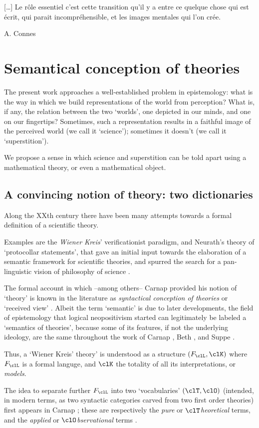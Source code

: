 \epigraph{[\dots\unkern] Le rôle essentiel c'est cette transition qu'il y a entre ce quelque chose qui est écrit, qui parait incompréhensible, et les images mentales qui l'on crée.}{A. Connes}
\section{Semantical conception of theories}\label{sec_1_intro}
The present work approaches a well-established problem in epistemology: what is the way in which we build representations of the world from perception? What is, if any, the relation between the two `worlds', one depicted in our minds, and one on our fingertips? Sometimes, such a representation results in a faithful image of the perceived world (we call it `science'); sometimes it doesn't (we call it `superstition'). 

We propose a sense in which science and superstition can be told apart using a mathematical theory, or even a mathematical object.
\subsection{A convincing notion of theory: two dictionaries}
Along the XXth century there have been many attempts towards a formal definition of a scientific theory. 

Examples are the \emph{Wiener Kreis}' verificationist paradigm, and Neurath's theory of `protocollar statements', that gave an initial input towards the elaboration of a semantic framework for scientific theories, and spurred the search for a pan-linguistic vision of philosophy of science \cite{Weinb}.

The formal account in which --among others-- Carnap \cite{carnapfound} provided his notion of `theory' is known in the literature as \emph{syntactical conception of theories} or `received view' \cite{krause-foundation,krause2011axiomatization,giunti2016}. Albeit the term `semantic' is due to later developments, the field of epistemology that logical neopositivism started can legitimately be labeled a `semantics of theories', because some of its features, if not the underlying ideology, are the same throughout the work of Carnap \cite{carnap56,carnapfound},  Beth \cite{?}, and Suppe \cite{suppe89}.

Thus, a `Wiener Kreis' theory' is understood as a structure $(F_\clL, \clK)$ where $F_\clL$ is a formal languge, and $\clK$ the totality of all its interpretations, or \emph{models}. 

The idea to separate further $F_\clL$ into two `vocabularies' $(\clT,\clO)$ (intended, in modern terms, as two syntactic categories carved from two first order theories) first appears in Carnap \cite{}; these are respectively the \emph{pure} or $\clT$\emph{heoretical} terms, and the \emph{applied} or $\clO$\emph{bservational} terms \cite{refs_on_erkennen}. 


